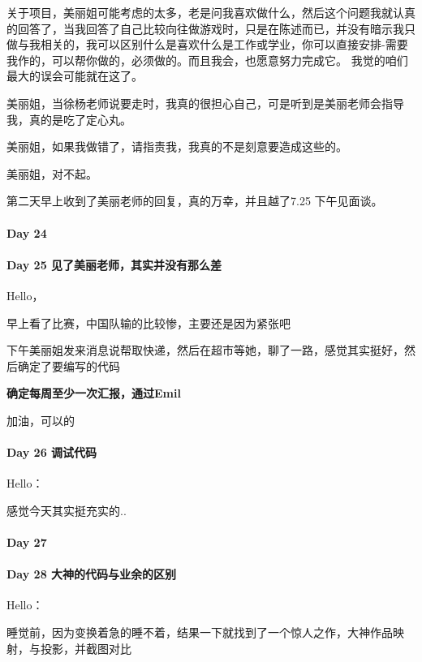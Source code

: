 \documentclass[UTF8,a4paper,8pt]{ctexbook}
\begin{document}
	 	 关于项目，美丽姐可能考虑的太多，老是问我喜欢做什么，然后这个问题我就认真的回答了，当我回答了自己比较向往做游戏时，只是在陈述而已，并没有暗示我只 做与我相关的，我可以区别什么是喜欢什么是工作或学业，你可以直接安排-需要我作的，可以帮你做的，必须做的。而且我会，也愿意努力完成它。 我觉的咱们最大的误会可能就在这了。
	 	 
	 	 美丽姐，当徐杨老师说要走时，我真的很担心自己，可是听到是美丽老师会指导我，真的是吃了定心丸。
	 	 
	 	 美丽姐，如果我做错了，请指责我，我真的不是刻意要造成这些的。
	 	 
	 	 美丽姐，对不起。
	 	 
	 	 第二天早上收到了美丽老师的回复，真的万幸，并且越了7.25 下午见面谈。
 	 \paragraph{Day 24      \quad     }
 	 \paragraph{Day 25   见了美丽老师，其实并没有那么差   \quad     }
	 	 Hello，
	 	 
	 	 早上看了比赛，中国队输的比较惨，主要还是因为紧张吧
	 	 
	 	 下午美丽姐发来消息说帮取快递，然后在超市等她，聊了一路，感觉其实挺好，然后确定了要编写的代码
	 	 
	 	 \textbf{确定每周至少一次汇报，通过Emil}
	 	 
	 	 加油，可以的
 	 \paragraph{Day 26   调试代码   \quad     }
	 	 Hello：
	 	 
	 	 感觉今天其实挺充实的..
 	 \paragraph{Day 27      \quad     }
 	 \paragraph{Day 28   大神的代码与业余的区别   \quad     }
	 	 Hello：
	 	 
	 	 睡觉前，因为变换着急的睡不着，结果一下就找到了一个惊人之作，大神作品映射，与投影，并截图对比
		 
\end{document}
